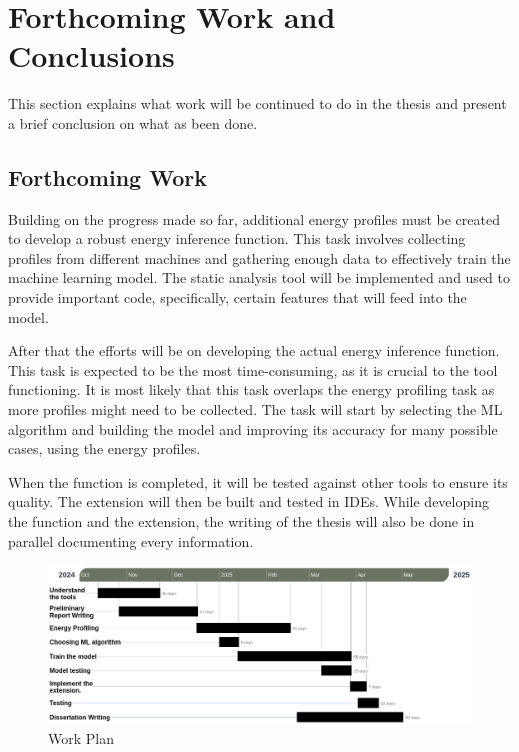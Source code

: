 \documentclass[sigplan]{acmart}
\begin{document}
\section{Forthcoming Work and Conclusions} \label{sec:forthcoming_work_and_conclusions}

This section explains what work will be continued to do in the thesis and present a brief conclusion on what as been done.

\subsection{Forthcoming Work}

Building on the progress made so far, additional energy profiles must be created to develop a robust energy inference function. This task involves collecting profiles from different machines and gathering enough data to effectively train the machine learning model. The static analysis tool will be implemented and used to provide important code, specifically, certain features that will feed into the model.

After that the efforts will be on developing the actual energy inference function. This task is expected to be the most time-consuming, as it is crucial to the tool functioning. It is most likely that this task overlaps the energy profiling task as more profiles might need to be collected. The task will start by selecting the ML algorithm and building the model and improving its accuracy for many possible cases, using the energy profiles.

When the function is completed, it will be tested against other tools to ensure its quality. The extension will then be built and tested in IDEs.
While developing the function and the extension, the writing of the thesis will also be done in parallel documenting every information.

\begin{figure}%
  \centering
  \includegraphics[width = 1 \textwidth]{figures/gantt_diagram.png}
  \caption{Work Plan}
  \label{fig:gantt_diagram}
\end{figure}
\end{document}
